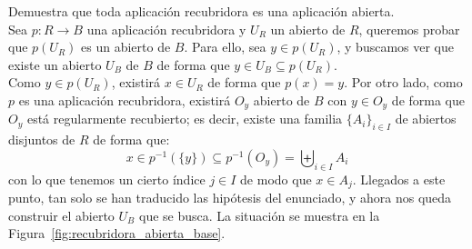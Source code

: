 \begin{ejercicio}\label{ej:1_recubridora_abierta} %
    Demuestra que toda aplicación recubridora es una aplicación abierta.\\

    Sea $p:R\to B$ una aplicación recubridora y $U_R$ un abierto de $R$, queremos probar que $p(U_R)$ es un abierto de $B$. Para ello, sea $y\in p(U_R)$, y buscamos ver que existe un abierto $U_B$ de $B$ de forma que $y\in U_B \subseteq p(U_R)$.\\
    
    Como $y\in p(U_R)$, existirá $x\in U_R$ de forma que $p(x) = y$. Por otro lado, como $p$ es una aplicación recubridora, existirá $O_y$ abierto de $B$ con $y\in O_y$ de forma que $O_y$ está regularmente recubierto; es decir, existe una familia $\{A_i\}_{i \in I}$ de abiertos disjuntos de $R$ de forma que:
    \begin{equation*}
        x\in p^{-1}(\{y\}) \subseteq p^{-1}(O_y) = \biguplus_{i \in I}A_i
    \end{equation*}
    con lo que tenemos un cierto índice $j \in I$ de modo que $x\in A_j$. Llegados a este punto, tan solo se han traducido las hipótesis del enunciado, y ahora nos queda construir el abierto $U_B$ que se busca. La situación se muestra en la Figura~\ref{fig:recubridora_abierta_base}.
    \begin{figure}[ht]
        \centering
\end{figure}
\end{ejercicio}
